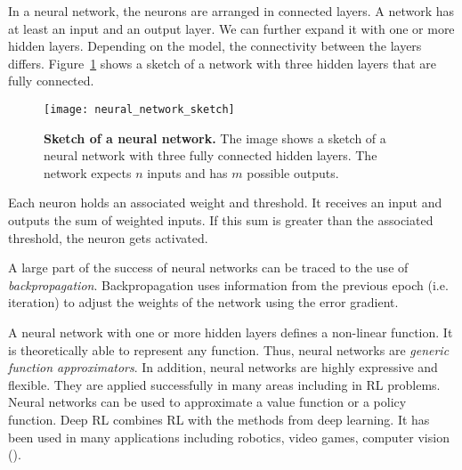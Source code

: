 In a neural network, the neurons are arranged in connected layers. A network has at least an input and an output layer. We can further expand it with one or more hidden layers. Depending on the model, the connectivity between the layers differs. Figure~\ref{fig:neural_network_sketch} shows a sketch of a network with three hidden layers that are fully connected.
\begin{figure}[ht]
\centering
\texttt{[image: neural\_network\_sketch]}
\caption[Sketch of a Neural Network]{
  \textbf{Sketch of a neural network.}
  The image shows a sketch of a neural network with three fully connected hidden layers. The network expects $n$ inputs and has $m$ possible outputs.
}
\label{fig:neural_network_sketch}
\end{figure}
Each neuron holds an associated weight and threshold. It receives an input and outputs the sum of weighted inputs. If this sum is greater than the associated threshold, the neuron gets activated.

A large part of the success of neural networks can be traced to the use of \textit{backpropagation}. Backpropagation uses information from the previous epoch (i.e. iteration) to adjust the weights of the network using the error gradient.

A neural network with one or more hidden layers defines a non-linear function. It is theoretically able to represent any function. Thus, neural networks are \textit{generic function approximators}. In addition, neural networks are highly expressive and flexible. They are applied successfully in many areas including in RL problems. Neural networks can be used to approximate a value function or a policy function. Deep RL combines RL with the methods from deep learning. It has been used in many applications including robotics, video games, computer vision (\cite{franccois2018introduction}).




